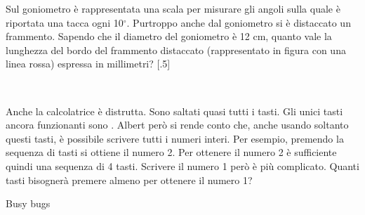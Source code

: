 \documentclass[12pt]{matemaj}
\begin{document}
\vspace{-.8cm}
\quesitotc[60;150]
[.5]Sul goniometro è rappresentata una scala per misurare gli angoli sulla quale è riportata una tacca ogni 10$^\circ$. Purtroppo anche dal goniometro si è distaccato un frammento. Sapendo che il diametro del goniometro è 12 cm, quanto vale la lunghezza del bordo del frammento distaccato (rappresentato in figura con una linea rossa) espressa in millimetri?
[.5]\tikspace{} \\ \vspace{.3cm}\tikspace{}

\vspace{-.8cm}
\quesito[1;50]
Anche la calcolatrice è distrutta. Sono saltati quasi tutti i tasti. Gli unici tasti ancora funzionanti sono\;   \btn{+} \btn{-} \btn{=}. Albert però si rende conto che, anche usando soltanto questi tasti, è possibile scrivere tutti i numeri interi. Per esempio, premendo la sequenza di tasti  \btn{-}  \btn{=} si ottiene il numero 2. Per ottenere il numero 2 è sufficiente quindi una sequenza di 4 tasti. Scrivere il numero 1 però è più complicato. Quanti tasti bisognerà premere almeno per ottenere il numero 1?

\newpage
\titolo Busy bugs
\end{document}
